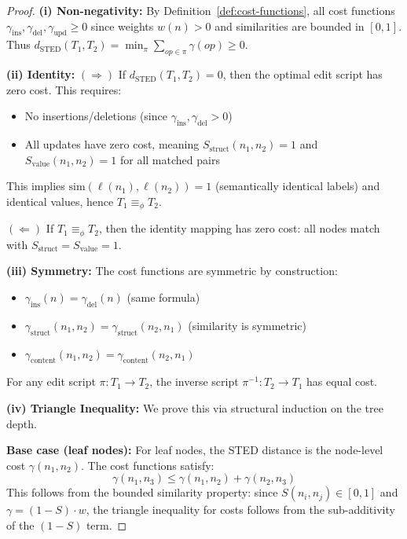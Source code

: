 \documentclass{article}
\begin{document}
\begin{proof}
\textbf{(i) Non-negativity:} By Definition~\ref{def:cost-functions}, all cost functions $\gamma_{\text{ins}}, \gamma_{\text{del}}, \gamma_{\text{upd}} \geq 0$ since weights $w(n) > 0$ and similarities are bounded in $[0,1]$. Thus $d_{\text{STED}}(T_1, T_2) = \min_\pi \sum_{op \in \pi} \gamma(op) \geq 0$.

\textbf{(ii) Identity:}
$(\Rightarrow)$ If $d_{\text{STED}}(T_1, T_2) = 0$, then the optimal edit script has zero cost. This requires:
\begin{itemize}
    \item No insertions/deletions (since $\gamma_{\text{ins}}, \gamma_{\text{del}} > 0$)
    \item All updates have zero cost, meaning $S_{\text{struct}}(n_1, n_2) = 1$ and $S_{\text{value}}(n_1, n_2) = 1$ for all matched pairs
\end{itemize}
This implies $\text{sim}(\ell(n_1), \ell(n_2)) = 1$ (semantically identical labels) and identical values, hence $T_1 \equiv_\phi T_2$.

$(\Leftarrow)$ If $T_1 \equiv_\phi T_2$, then the identity mapping has zero cost: all nodes match with $S_{\text{struct}} = S_{\text{value}} = 1$.

\textbf{(iii) Symmetry:} The cost functions are symmetric by construction:
\begin{itemize}
    \item $\gamma_{\text{ins}}(n) = \gamma_{\text{del}}(n)$ (same formula)
    \item $\gamma_{\text{struct}}(n_1, n_2) = \gamma_{\text{struct}}(n_2, n_1)$ (similarity is symmetric)
    \item $\gamma_{\text{content}}(n_1, n_2) = \gamma_{\text{content}}(n_2, n_1)$
\end{itemize}
For any edit script $\pi: T_1 \to T_2$, the inverse script $\pi^{-1}: T_2 \to T_1$ has equal cost.

\textbf{(iv) Triangle Inequality:} We prove this via structural induction on the tree depth.

\textbf{Base case (leaf nodes):} For leaf nodes, the STED distance is the node-level cost $\gamma(n_1, n_2)$. The cost functions satisfy:
\begin{equation}
    \gamma(n_1, n_3) \leq \gamma(n_1, n_2) + \gamma(n_2, n_3)
\end{equation}
This follows from the bounded similarity property: since $S(n_i, n_j) \in [0,1]$ and $\gamma = (1 - S) \cdot w$, the triangle inequality for costs follows from the sub-additivity of the $(1-S)$ term.


\end{proof}
\end{document}
